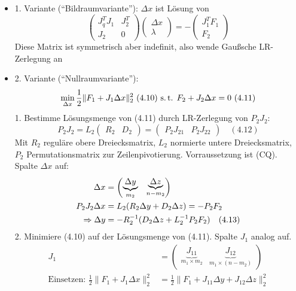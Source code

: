 
\begin{itemize}
\item 1. Variante ("`Bildraumvariante"'): $\Delta x$ ist Lösung von 
\[ \begin{pmatrix} J_q^T J_1 & J_2^T \\ J_2 & 0 \end{pmatrix} \begin{pmatrix} \Delta x \\ \lambda \end{pmatrix} = - \begin{pmatrix} J_1^T F_1 \\ F_2 \end{pmatrix} \]
Diese Matrix ist symmetrisch aber indefinit, also wende Gaußsche LR-Zerlegung an
\item 2. Variante ("`Nullraumvariante"'): %
\[ \min_{\Delta x} \frac 12 \| F_1 + J_1 \Delta x\|_2^2 \text{ (4.10) s.\,t. } F_2 + J_2 \Delta x = 0 \text{ (4.11)} \]
1. Bestimme Lösungsmenge von (4.11) durch LR-Zerlegung von $P_2 J_2$:
\[ P_2 J_2 = L_2 \begin{pmatrix} R_2 & D_2 \end{pmatrix} = \begin{pmatrix} P_2 J_{21} & P_2 J_{22} \end{pmatrix} \quad (4.12)\]
Mit $R_2$ reguläre obere Dreiecksmatrix, $L_2$ normierte untere Dreiecksmatrix, $P_2$ Permutationsmatrix zur Zeilenpivotierung. Vorraussetzung ist (CQ). Spalte $\Delta x$ auf: 
\begin{align*}
\Delta x &= \begin{pmatrix}\underbrace{ \Delta y}_{m_2} & \underbrace{\Delta z}_{n-m_2} \end{pmatrix} \\
P_2 J_2 \Delta x &= L_2( R_2 \Delta y + D_2 \Delta z) = - P_2 F_2 \\
\Rightarrow \Delta y &= - R_2^{-1} ( D_2 \Delta z + L_2^{-1} P_2 F_2) \quad (4.13) \\
\end{align*}
2. Minimiere (4.10) auf der Lösungsmenge von (4.11). Spalte $J_1$ analog auf.
\begin{align*}
J_1 &= \begin{pmatrix}\underbrace{ J_{11}}_{m_1 \times m_2} & \underbrace{J_{12}}_{m_1 \times (n-m_2)} \end{pmatrix} \\
\text{Einsetzen: } \frac 12 \| F_1 + J_1 \Delta x \|_2^2 &= \frac 12 \|F_1 + J_{11} \Delta y + J_{12} \Delta z \|_2^2 \\

\end{align*}
\end{itemize}
